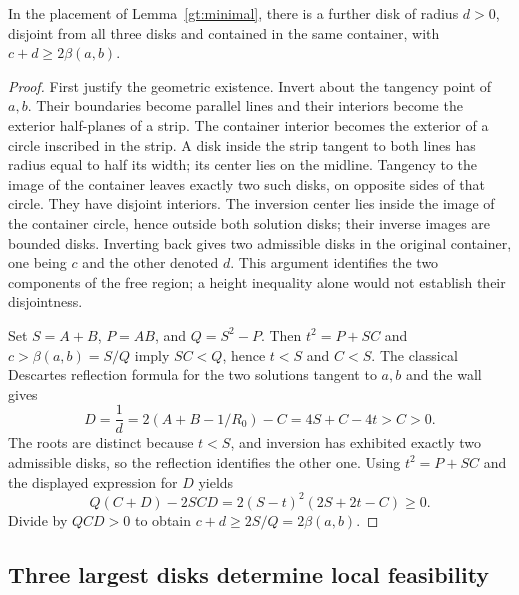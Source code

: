 \begin{lemma}\label{gt:opposite}
In the placement of Lemma~\ref{gt:minimal}, there is a further disk
of radius $d>0$, disjoint from all three disks and contained in the
same container, with $c+d\ge2\beta(a,b)$.
\end{lemma}
\begin{proof}
First justify the geometric existence. Invert about the tangency point
of $a,b$. Their boundaries become parallel lines and their interiors
become the exterior half-planes of a strip. The container interior
becomes the exterior of a circle inscribed in the strip. A disk inside
the strip tangent to both lines has radius equal to half its width;
its center lies on the midline. Tangency to the image of the container
leaves exactly two such disks, on opposite sides of that circle. They
have disjoint interiors. The inversion center lies inside the image
of the container circle, hence outside both solution disks; their inverse
images are bounded disks. Inverting back gives two admissible disks in
the original container, one being $c$ and the other denoted $d$.
This argument identifies the two components of the free region; a
height inequality alone would not establish their disjointness.

Set $S=A+B$, $P=AB$, and $Q=S^2-P$. Then $t^2=P+SC$ and
$c>\beta(a,b)=S/Q$ imply $SC<Q$, hence $t<S$ and $C<S$.
The classical Descartes reflection formula for the two solutions
tangent to $a,b$ and the wall \cite[Section 3.3]{GrahamEtAl2005} gives
\[
 D=\frac1d=2(A+B-1/R_0)-C=4S+C-4t>C>0.
\]
The roots are distinct because $t<S$, and inversion has exhibited
exactly two admissible disks, so the reflection identifies the other one.
Using $t^2=P+SC$ and the displayed expression for $D$ yields
\[
 Q(C+D)-2SCD=2(S-t)^2(2S+2t-C)\ge0.
\]
Divide by $QCD>0$ to obtain $c+d\ge2S/Q=2\beta(a,b)$.
\end{proof}

\subsection{Three largest disks determine local feasibility}

